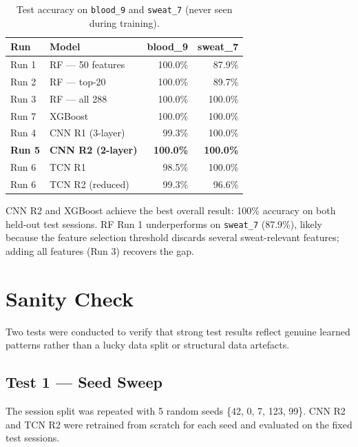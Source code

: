 \documentclass[11pt, a4paper]{article}
\newcommand{\acc}[1]{\textbf{#1}}
\begin{document}
\begin{table}[H]
\centering
\caption{Test accuracy on \texttt{blood\_9} and \texttt{sweat\_7} (never seen during training).}
\begin{tabular}{llrr}
\toprule
\textbf{Run} & \textbf{Model} & \textbf{blood\_9} & \textbf{sweat\_7} \\
\midrule
Run 1 & RF — 50 features    & 100.0\% & 87.9\% \\
Run 2 & RF — top-20         & 100.0\% & 89.7\% \\
Run 3 & RF — all 288        & 100.0\% & 100.0\% \\
Run 7 & XGBoost             & 100.0\% & 100.0\% \\
Run 4 & CNN R1 (3-layer)    & 99.3\%  & 100.0\% \\
\textbf{Run 5} & \textbf{CNN R2 (2-layer)} & \acc{100.0\%} & \acc{100.0\%} \\
Run 6 & TCN R1              & 98.5\%  & 100.0\% \\
Run 6 & TCN R2 (reduced)    & 99.3\%  & 96.6\% \\
\bottomrule
\end{tabular}
\end{table}

CNN R2 and XGBoost achieve the best overall result: 100\% accuracy on both
held-out test sessions. RF Run 1 underperforms on \texttt{sweat\_7} (87.9\%),
likely because the feature selection threshold discards several sweat-relevant
features; adding all features (Run 3) recovers the gap.

\section{Sanity Check}

Two tests were conducted to verify that strong test results reflect genuine
learned patterns rather than a lucky data split or structural data artefacts.

\subsection{Test 1 — Seed Sweep}

The session split was repeated with 5 random seeds \{42, 0, 7, 123, 99\}. CNN R2
and TCN R2 were retrained from scratch for each seed and evaluated on the fixed
test sessions.
\end{document}
